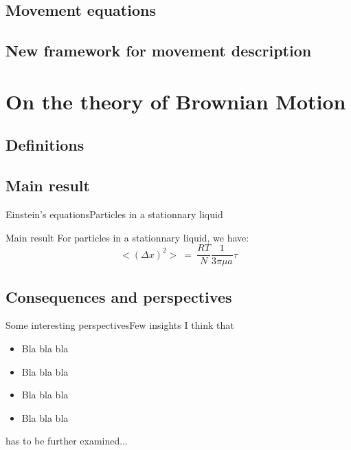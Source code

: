 \documentclass[10pt, compress]{beamer}
\begin{document}
\subsection{Movement equations}
\subsection{New framework for movement description}

\section{On the theory of Brownian Motion}

\subsection{Definitions}
\subsection{Main result}

\begin{frame}{Einstein's equations}{Particles in a stationnary liquid}
\begin{block}{Main result}
For particles in a stationnary liquid, we have:
$$
< (\Delta x)^2 > ~=~ \frac{RT}{N} \frac{1}{3 \pi \mu a} \tau
$$

\end{block}
\end{frame}

\subsection{Consequences and perspectives}


\begin{frame}{Some interesting perspectives}{Few insights}
I think that 
\begin{itemize}
    \item Bla bla bla
    \item Bla \textcolor{solarizedYellow}{bla bla}
    \item Bla bla bla
    \item Bla bla bla
\end{itemize}
has to be further examined...
\end{frame}
\end{document}

